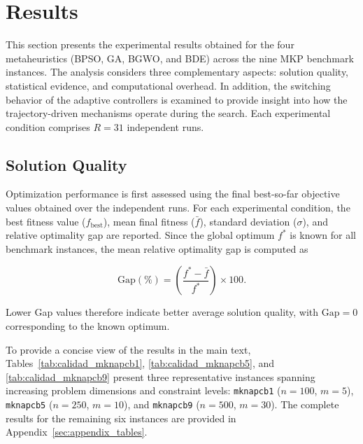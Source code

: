 \documentclass[journal,article,submit,moreauthors]{Definitions/mdpi}
\begin{document}
\section{Results}
\label{sec:results}

This section presents the experimental results obtained for the four
metaheuristics (BPSO, GA, BGWO, and BDE) across the nine MKP benchmark
instances. The analysis considers three complementary aspects: solution
quality, statistical evidence, and computational overhead. In addition,
the switching behavior of the adaptive controllers is examined to provide
insight into how the trajectory-driven mechanisms operate during the search.
Each experimental condition comprises $R=31$ independent runs.

\subsection{Solution Quality}
\label{subsec:solution_quality}

Optimization performance is first assessed using the final best-so-far
objective values obtained over the independent runs. For each experimental
condition, the best fitness value ($f_{\mathrm{best}}$), mean final fitness
($\bar{f}$), standard deviation ($\sigma$), and relative optimality gap are
reported. Since the global optimum $f^*$ is known for all benchmark
instances, the mean relative optimality gap is computed as

\begin{equation}
    \text{Gap}(\%) =
    \left(
    \frac{f^*-\bar{f}}{f^*}
    \right)\times100.
    \label{eq:gap_results}
\end{equation}

Lower Gap values therefore indicate better average solution quality, with
$\text{Gap}=0$ corresponding to the known optimum.

To provide a concise view of the results in the main text,
Tables~\ref{tab:calidad_mknapcb1},
\ref{tab:calidad_mknapcb5}, and
\ref{tab:calidad_mknapcb9} present three representative instances spanning
increasing problem dimensions and constraint levels:
\texttt{mknapcb1} ($n=100$, $m=5$),
\texttt{mknapcb5} ($n=250$, $m=10$), and
\texttt{mknapcb9} ($n=500$, $m=30$).
The complete results for the remaining six instances are provided in
Appendix~\ref{sec:appendix_tables}.
\end{document}
